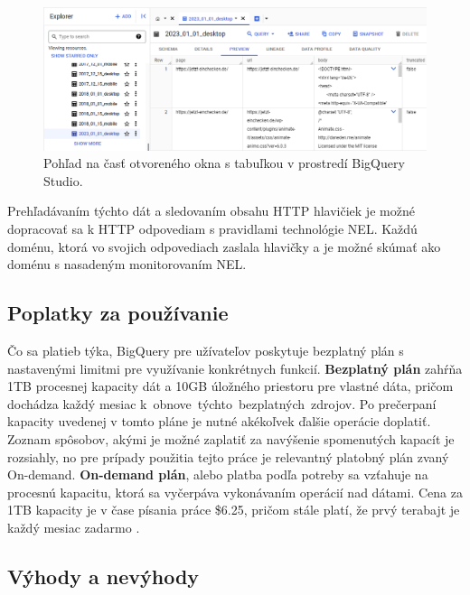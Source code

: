 \begin{figure}[htb]
\begin{center}
 \includegraphics[scale=0.53]{obrazky-figures/bigquery_response_bodies.png}    
 \caption{Pohľad na časť otvoreného okna s tabuľkou  v prostredí BigQuery Studio.}
 \label{img:bigquery-example-table}
\end{center}
\end{figure}

Prehľadávaním týchto dát a sledovaním obsahu HTTP hlavičiek je možné dopracovať sa k HTTP odpovediam s pravidlami technológie NEL.
Každú doménu, ktorá vo svojich odpovediach zaslala hlavičky  a  je možné skúmať ako doménu s nasadeným monitorovaním NEL.

\pagebreak

\subsection{Poplatky za používanie}
\label{httparchive-costs}

Čo sa platieb týka, BigQuery pre užívateľov poskytuje bezplatný plán s nastavenými limitmi pre využívanie konkrétnych funkcií.
\textbf{Bezplatný plán} zahŕňa 1TB procesnej kapacity dát a 10GB úložného priestoru pre vlastné dáta, pričom dochádza každý mesiac \mbox{k obnove týchto bezplatných zdrojov}.
Po prečerpaní kapacity uvedenej v tomto pláne je nutné akékoľvek ďalšie operácie doplatiť.
Zoznam spôsobov, akými je možné zaplatiť za navýšenie spomenutých kapacít je rozsiahly, no pre prípady použitia tejto práce je relevantný platobný plán zvaný On-demand.
\textbf{On-demand plán}, alebo platba podľa potreby sa vzťahuje na procesnú kapacitu, ktorá sa vyčerpáva vykonávaním operácií nad dátami.
Cena za 1TB kapacity je v čase písania práce \$6.25, pričom stále platí, že prvý terabajt je každý mesiac zadarmo \cite{google-bq-pricing}.

\subsection{Výhody a nevýhody}

